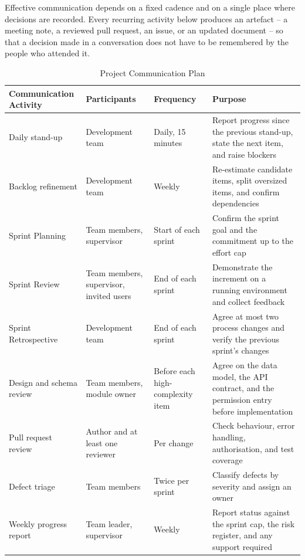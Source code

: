 Effective communication depends on a fixed cadence and on a single place where decisions are recorded. Every recurring activity below produces an artefact -- a meeting note, a reviewed pull request, an issue, or an updated document -- so that a decision made in a conversation does not have to be remembered by the people who attended it.

\begin{table}[H]
\centering
\begin{tabular}{|p{3.5cm}|p{3.0cm}|p{2.1cm}|p{4.8cm}|}
\hline
\rowcolor{headerbg}
\textbf{Communication Activity} &
\textbf{Participants} &
\textbf{Frequency} &
\textbf{Purpose} \\
\hline

Daily stand-up &
Development team &
Daily, 15 minutes &
Report progress since the previous stand-up, state the next item, and raise blockers \\
\hline

Backlog refinement &
Development team &
Weekly &
Re-estimate candidate items, split oversized items, and confirm dependencies \\
\hline

Sprint Planning &
Team members, supervisor &
Start of each sprint &
Confirm the sprint goal and the commitment up to the effort cap \\
\hline

Sprint Review &
Team members, supervisor, invited users &
End of each sprint &
Demonstrate the increment on a running environment and collect feedback \\
\hline

Sprint Retrospective &
Development team &
End of each sprint &
Agree at most two process changes and verify the previous sprint's changes \\
\hline

Design and schema review &
Team members, module owner &
Before each high-complexity item &
Agree on the data model, the API contract, and the permission entry before implementation \\
\hline

Pull request review &
Author and at least one reviewer &
Per change &
Check behaviour, error handling, authorisation, and test coverage \\
\hline

Defect triage &
Team members &
Twice per sprint &
Classify defects by severity and assign an owner \\
\hline

Weekly progress report &
Team leader, supervisor &
Weekly &
Report status against the sprint cap, the risk register, and any support required \\
\hline

\end{tabular}
\caption{Project Communication Plan}
\label{tab:communication-plan}
\end{table}

